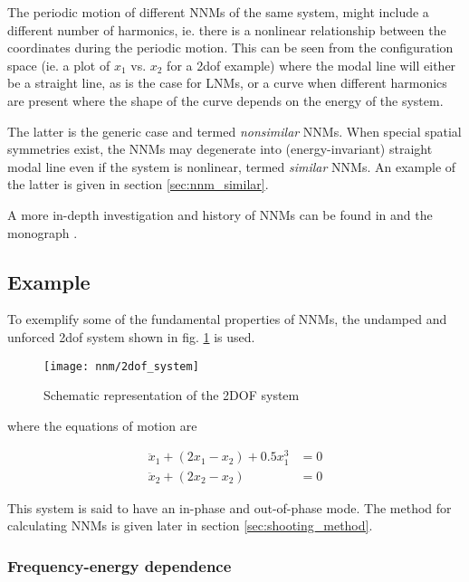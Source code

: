 The periodic motion of different NNMs of the same system, might include a
different number of harmonics, ie. there is a nonlinear relationship between the
coordinates during the periodic motion.
This can be seen from the configuration space (ie. a plot of $x_1$ vs. $x_2$ for a
2dof example) where the modal line will either be a straight line, as is the
case for LNMs, or a curve when different harmonics are present where the shape
of the curve depends on the energy of the system.

The latter is the generic case and termed \textit{nonsimilar} NNMs. When special
spatial symmetries exist, the NNMs may degenerate into (energy-invariant)
straight modal line even if the system is nonlinear, termed \textit{similar}
NNMs. An example of the latter is given in section \ref{sec:nnm_similar}.

A more in-depth investigation and history of NNMs can be found
in \autocite{kerschen2009a} and the monograph \autocite[chap 2.]{vakakis2008a}.



\subsection{Example}
\label{sec:nnm_example}

To exemplify some of the fundamental properties of NNMs, the undamped and
unforced 2dof system shown in fig. \ref{fig:nnm_2dof} is used.

\begin{figure}[!ht]
  \centering
  \texttt{[image: nnm/2dof\_system]}
  \caption{Schematic representation of the 2DOF system}
  \label{fig:nnm_2dof}
\end{figure}
where the equations of motion are

\begin{equation}
  \label{eq:nnm_2dof}
  \begin{aligned}
    \ddot x_1 + (2x_1 - x_2) + 0.5 x_1^3 &= 0 \\
    \ddot x_2 + (2x_2 - x_2) &= 0
  \end{aligned}
\end{equation}

This system is said to have an in-phase and out-of-phase mode.
The method for calculating NNMs is given later in section
\ref{sec:shooting_method}.

\subsubsection{Frequency-energy dependence}

